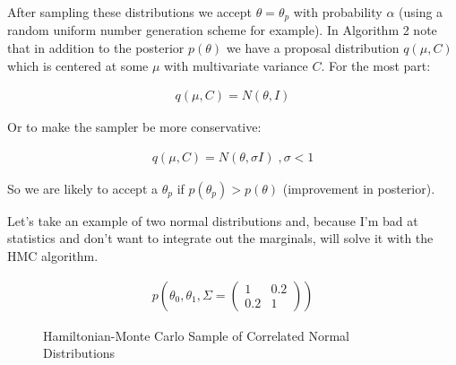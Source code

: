 \documentclass[12pt]{article}
\begin{document}
\vspace{5mm}

After sampling these distributions we accept $\theta = \theta_p$ with probability $\alpha$ (using a random uniform number generation scheme for example). In Algorithm 2 note that in addition to the posterior $p(\theta)$ we have a proposal distribution $q(\mu,C)$ which is centered at some $\mu$ with multivariate variance $C$. For the most part:

\begin{align*}
q(\mu,C) = N(\theta,I)
\end{align*}

Or to make the sampler be more conservative:

\begin{align*}
q(\mu,C) = N(\theta,\sigma I) \;, \sigma < 1
\end{align*}

\vspace{5mm}

So we are likely to accept a $\theta_p$ if $p(\theta_p)>p(\theta)$ (improvement in posterior).

\vspace{5mm}

Let's take an example of two normal distributions and, because I'm bad at statistics and don't want to integrate out the marginals, will solve it with the HMC algorithm.

\begin{align*}
p(\theta_0,\theta_1,\Sigma = \begin{pmatrix} 1 & 0.2 \\ 0.2 & 1 \end{pmatrix})
\end{align*}

\begin{figure}[h]
\centering
{}
\caption{Hamiltonian-Monte Carlo Sample of Correlated Normal Distributions}
\end{figure}
\end{document}
